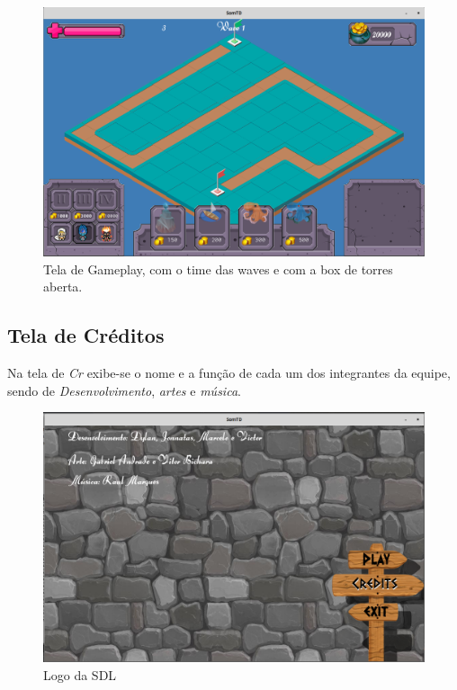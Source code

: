 \documentclass[11pt]{article} %
\begin{document}
\begin{figure}[!htp]
\centering
\includegraphics[scale=0.3]{res/gameplay2.png}
\caption{Tela de Gameplay, com o time das waves e com a box de torres aberta.}
\end{figure}

\newpage
\subsection{Tela de Créditos}

Na tela de \textit{Cr} exibe-se o nome e a função de cada um dos integrantes da equipe, sendo de \textit{Desenvolvimento}, \textit{artes} e \textit{música}.

\begin{figure}[!htp]
\centering
\includegraphics[scale=0.3]{res/credits_display.png}
\caption{Logo da SDL}
\label{Logo da SDL}
\end{figure}
\end{document}
